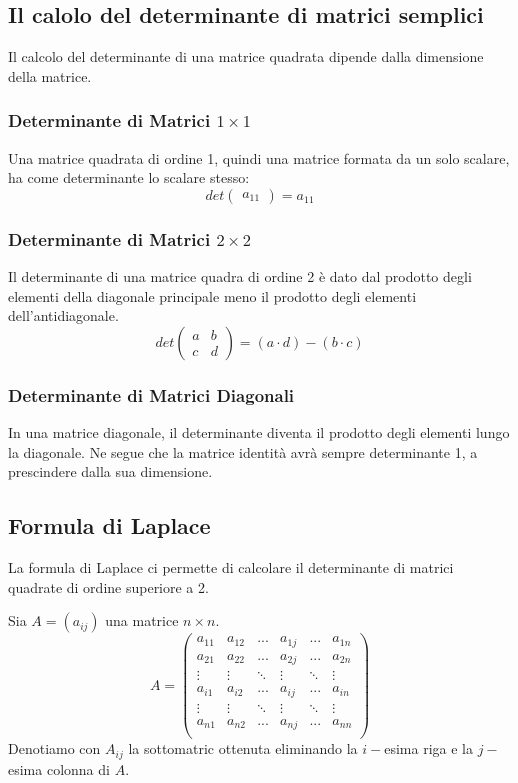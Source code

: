 \subsection{Il calolo del determinante di matrici semplici}
Il calcolo del determinante di una matrice quadrata dipende dalla dimensione della matrice.
\subsubsection{Determinante di Matrici $1\times 1$}
Una matrice quadrata di ordine 1, quindi una matrice formata da un solo scalare, ha come determinante lo scalare stesso:
\[
	det
	\begin{pmatrix}
		a_{11}
	\end{pmatrix}
	= a_{11}
\]
\subsubsection{Determinante di Matrici $2\times2$}
Il determinante di una matrice quadra di ordine 2 è dato dal prodotto degli elementi della diagonale principale meno il prodotto degli elementi dell'antidiagonale.
\[
	det
	\begin{pmatrix}
		a & b \\
		c & d
	\end{pmatrix}
	= (a \cdot d) - (b\cdot c)
\]

\subsubsection{Determinante di Matrici Diagonali}
In una matrice diagonale, il determinante diventa il prodotto degli elementi lungo la diagonale.
Ne segue che la matrice identità avrà sempre determinante 1, a prescindere dalla sua dimensione.
\subsection{Formula di Laplace}
La formula di Laplace ci permette di calcolare il determinante di matrici quadrate di ordine superiore a 2.

Sia $A = (a_{ij})$ una matrice $n\times n$.
\[
	A = \begin{pmatrix}
		a_{11} & a_{12} & ...    & a_{1j} & ...    & a_{1n} \\
		a_{21} & a_{22} & ...    & a_{2j} & ...    & a_{2n} \\
		\vdots & \vdots & \ddots & \vdots & \ddots & \vdots \\
		a_{i1} & a_{i2} & ...    & a_{ij} & ...    & a_{in} \\
		\vdots & \vdots & \ddots & \vdots & \ddots & \vdots \\
		a_{n1} & a_{n2} & ...    & a_{nj} & ...    & a_{nn} \\
	\end{pmatrix}
\]
Denotiamo con $A_{ij}$ la sottomatric ottenuta eliminando la $i-$esima riga e la $j-$esima colonna di $A$.

